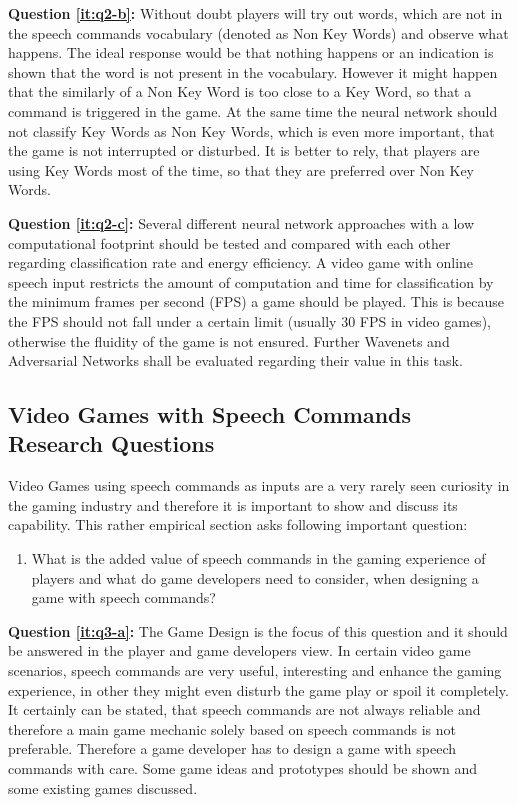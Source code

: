 \textbf{Question \ref{it:q2-b}:} Without doubt players will try out words, which are not in the speech commands vocabulary (denoted as Non Key Words) and observe what happens.
The ideal response would be that nothing happens or an indication is shown that the word is not present in the vocabulary. 
However it might happen that the similarly of a Non Key Word is too close to a Key Word, so that a command is triggered in the game. 
At the same time the neural network should not classify Key Words as Non Key Words, which is even more important, that the game is not interrupted or disturbed.
It is better to rely, that players are using Key Words most of the time, so that they are preferred over Non Key Words.

\textbf{Question \ref{it:q2-c}:}
Several different neural network approaches with a low computational footprint should be tested and compared with each other regarding classification rate and energy efficiency. 
A video game with online speech input restricts the amount of computation and time for classification by the minimum frames per second (FPS) a game should be played.
This is because the FPS should not fall under a certain limit (usually 30 FPS in video games), otherwise the fluidity of the game is not ensured.
Further Wavenets and Adversarial Networks shall be evaluated regarding their value in this task.


\subsection{Video Games with Speech Commands Research Questions}\label{sec:intro_rq_games}
Video Games using speech commands as inputs are a very rarely seen curiosity in the gaming industry and therefore it is important to show and discuss its capability. This rather empirical section asks following important question:

\begin{enumerate}[label={Q.3.\alph*)}, leftmargin=1.75cm]
    \item What is the added value of speech commands in the gaming experience of players and what do game developers need to consider, when designing a game with speech commands?
    \label{it:q3-a}
    
\end{enumerate}
\noindent
\textbf{Question \ref{it:q3-a}:} The Game Design is the focus of this question and it should be answered in the player and game developers view.
In certain video game scenarios, speech commands are very useful, interesting and enhance the gaming experience, in other they might even disturb the game play or spoil it completely.
It certainly can be stated, that speech commands are not always reliable and therefore a main game mechanic solely based on speech commands is not preferable.
Therefore a game developer has to design a game with speech commands with care.
Some game ideas and prototypes should be shown and some existing games discussed.


